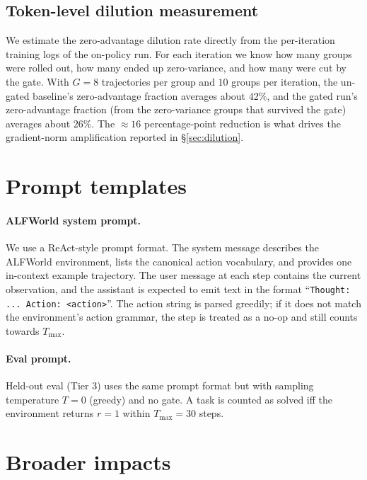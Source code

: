 \documentclass{article}
\begin{document}
\subsection{Token-level dilution measurement}
\label{app:dilution_appendix}

We estimate the zero-advantage dilution rate directly from the
per-iteration training logs of the on-policy run. For each
iteration we know how many groups were rolled out, how many ended
up zero-variance, and how many were cut by the gate. With
$G = 8$ trajectories per group and $10$ groups per iteration,
the un-gated baseline's zero-advantage fraction averages
about $42\%$, and the gated run's zero-advantage fraction (from
the zero-variance groups that survived the gate) averages about
$26\%$. The $\approx\!16$ percentage-point reduction is what drives
the gradient-norm amplification reported in \S\ref{sec:dilution}.


\section{Prompt templates}
\label{app:prompts}

\paragraph{ALFWorld system prompt.}
We use a ReAct-style prompt format. The system message describes
the ALFWorld environment, lists the canonical action vocabulary,
and provides one in-context example trajectory. The user message
at each step contains the current observation, and the assistant
is expected to emit text in the format
``\texttt{Thought: ... Action: <action>}''. The action string is
parsed greedily; if it does not match the environment's action
grammar, the step is treated as a no-op and still counts towards
$T_{\max}$.

\paragraph{Eval prompt.}
Held-out eval (Tier 3) uses the same prompt format but with sampling
temperature $T\!=\!0$ (greedy) and no gate. A task is counted as
solved iff the environment returns $r\!=\!1$ within $T_{\max}\!=\!30$
steps.


\section{Broader impacts}
\label{app:broader}
\end{document}
